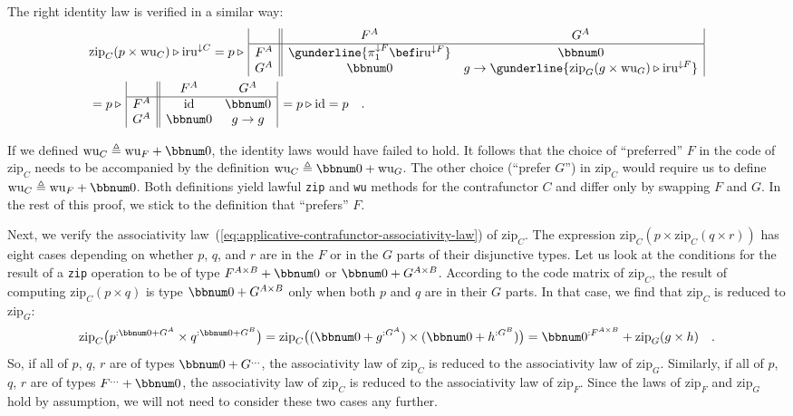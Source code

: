 The right identity law is verified in a similar way:
\begin{align*}
 & \text{zip}_{C}(p\times\text{wu}_{C})\triangleright\text{iru}^{\downarrow C}=p\triangleright\,\begin{array}{|c||cc|}
 & F^{A} & G^{A}\\
\hline F^{A} & \gunderline{\pi_{1}^{\downarrow F}\bef\text{iru}^{\downarrow F}} & \bbnum 0\\
G^{A} & \bbnum 0 & g\rightarrow\gunderline{\text{zip}_{G}(g\times\text{wu}_{G})\triangleright\text{iru}^{\downarrow F}}
\end{array}\\
 & =p\triangleright\,\begin{array}{|c||cc|}
 & F^{A} & G^{A}\\
\hline F^{A} & \text{id} & \bbnum 0\\
G^{A} & \bbnum 0 & g\rightarrow g
\end{array}\,=p\triangleright\text{id}=p\quad.
\end{align*}

If we defined $\text{wu}_{C}\triangleq\text{wu}_{F}+\bbnum 0$, the
identity laws would have failed to hold. It follows that the choice
of \textsf{``}preferred\textsf{''} $F$ in the code of $\text{zip}_{C}$ needs to
be accompanied by the definition $\text{wu}_{C}\triangleq\bbnum 0+\text{wu}_{G}$.
The other choice (\textsf{``}prefer $G$\textsf{''}) in $\text{zip}_{C}$ would require
us to define $\text{wu}_{C}\triangleq\text{wu}_{F}+\bbnum 0$. Both
definitions yield lawful \lstinline!zip! and \lstinline!wu! methods
for the contrafunctor $C$ and differ only by swapping $F$ and $G$.
In the rest of this proof, we stick to the definition that \textsf{``}prefers\textsf{''}
$F$.

Next, we verify the associativity law~(\ref{eq:applicative-contrafunctor-associativity-law})
of $\text{zip}_{C}$. The expression $\text{zip}_{C}(p\times\text{zip}_{C}(q\times r))$
has eight cases depending on whether $p$, $q$, and $r$ are in the
$F$ or in the $G$ parts of their disjunctive types. Let us look
at the conditions for the result of a \lstinline!zip! operation to
be of type $F^{A\times B}+\bbnum 0$ or $\bbnum 0+G^{A\times B}$.
According to the code matrix of $\text{zip}_{C}$, the result of computing
$\text{zip}_{C}(p\times q)$ is type $\bbnum 0+G^{A\times B}$ only
when both $p$ and $q$ are in their $G$ parts. In that case, we
find that $\text{zip}_{C}$ is reduced to $\text{zip}_{G}$:
\[
\text{zip}_{C}\big(p^{:\bbnum 0+G^{A}}\times q^{:\bbnum 0+G^{B}}\big)=\text{zip}_{C}\big((\bbnum 0+g^{:G^{A}})\times(\bbnum 0+h^{:G^{B}})\big)=\bbnum 0^{:F^{A\times B}}+\text{zip}_{G}(g\times h)\quad.
\]
So, if all of $p$, $q$, $r$ are of types $\bbnum 0+G^{...}$, the
associativity law of $\text{zip}_{C}$ is reduced to the associativity
law of $\text{zip}_{G}$. Similarly, if all of $p$, $q$, $r$ are
of types $F^{...}+\bbnum 0$, the associativity law of $\text{zip}_{C}$
is reduced to the associativity law of $\text{zip}_{F}$. Since the
laws of $\text{zip}_{F}$ and $\text{zip}_{G}$ hold by assumption,
we will not need to consider these two cases any further. 

